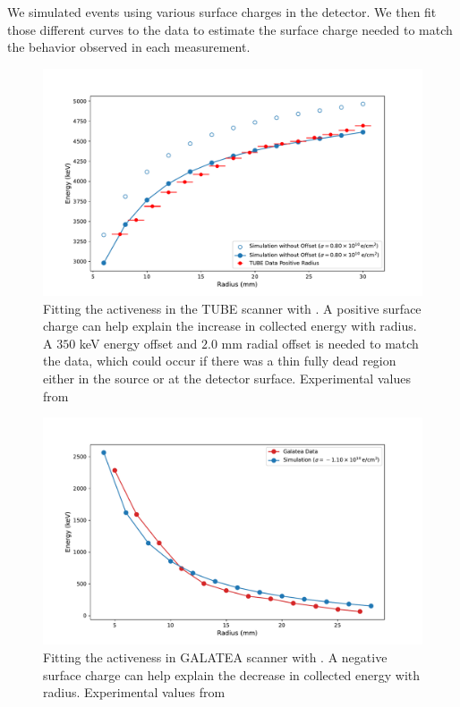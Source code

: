 

We simulated events using various surface charges in the {\ponama} detector.  We then fit those different curves to the data to estimate the surface charge needed to match the behavior observed in each measurement.

\begin{figure}%
\includegraphics[trim={0.3cm 0.1cm 1.7cm 0.1cm},clip,width=\linewidth]{ch5/figs/tube_fit.pdf}
\caption{Fitting the activeness in the TUBE scanner with \ehd{}. A positive surface charge can help explain the increase in collected energy with radius. A $350$ keV energy offset and $2.0$ mm radial offset is needed to match the data, which could occur if there was a thin fully dead region either in the source or at the detector surface. Experimental values from \cite{TUBE_paper}}
\label{fig:tube_fit}
\end{figure}


\begin{figure}%
\centering
\includegraphics[trim={0.3cm 0.1cm 1.7cm 1cm},clip,width=\linewidth]{ch5/figs/gal_fit.pdf}
\caption{Fitting the activeness in GALATEA scanner with \ehd{}. A negative surface charge can help explain the decrease in collected energy with radius. Experimental values from \cite{galatea_paper}}
\label{fig:gal_fit}
\end{figure}

